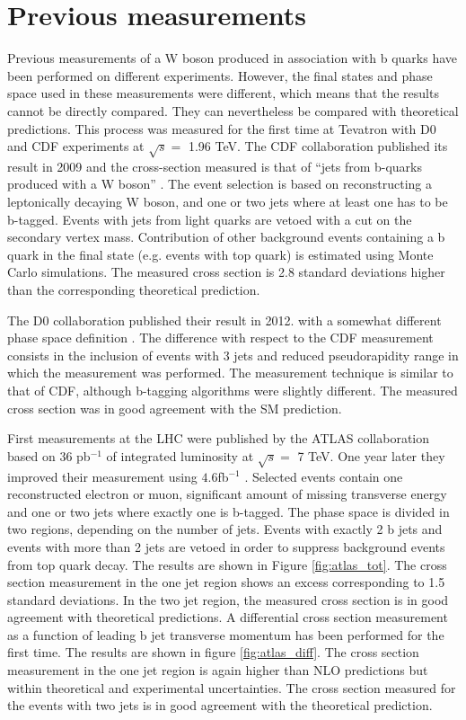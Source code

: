 \section{Previous measurements}
\label{sec:2.3}
	\par Previous measurements of a W boson produced in association with b quarks have been performed on different experiments. However, the final states and phase space used in these measurements were different, which means that the results cannot be directly compared. They can nevertheless be compared with theoretical predictions. This process was measured for the first time at Tevatron with D0 and CDF experiments at $\sqrt{s} =$ 1.96 TeV. The CDF collaboration published its result in 2009 and the cross-section measured is that of “jets from b-quarks produced with a W boson” \cite{Aaltonen:2009qi}. The event selection is based on reconstructing a leptonically decaying W boson, and one or two jets where at least one has to be b-tagged. Events with jets from light quarks are vetoed with a cut on the secondary vertex mass. Contribution of other background events containing a b quark in the final state (e.g. events with top quark) is estimated using Monte Carlo simulations. The measured cross section is 2.8 standard deviations higher than the corresponding theoretical prediction. 
\par The D0 collaboration published their result in 2012. with a somewhat different phase space definition \cite{D0:2012qt}. The difference with respect to the CDF measurement consists in the inclusion of events with 3 jets and reduced pseudorapidity range in which the measurement was performed. The measurement technique is similar to that of CDF, although b-tagging algorithms were slightly different. The measured cross section was in good agreement with the SM prediction.
\par	 First measurements at the LHC were published by the ATLAS collaboration based on 36 pb$^{-1}$ of integrated luminosity at $\sqrt{s} =$ 7 TeV. One year later they improved their measurement using $4.6$fb$^{-1}$ \cite{Aad:2013vka}. Selected events contain one reconstructed electron or muon, significant amount of missing transverse energy and one or two jets where exactly one is b-tagged. The phase space is divided in two regions, depending on the number of jets. Events with exactly 2 b jets and events with more than 2 jets are vetoed in order to suppress background events from top quark decay. The results are shown in Figure \ref{fig:atlas_tot}. The cross section measurement in the one jet region shows an excess corresponding to 1.5 standard deviations. In the two jet region, the measured cross section is in good agreement with theoretical predictions. A differential cross section measurement as a function of leading b jet transverse momentum has been performed for the first time. The results are shown in figure \ref{fig:atlas_diff}. The cross section measurement in the one jet region is again higher than NLO predictions but within theoretical and experimental uncertainties. The cross section measured for the events with two jets is in good agreement with the theoretical prediction.
